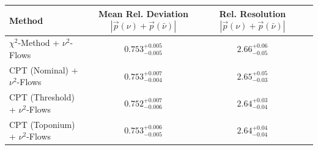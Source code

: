     \begin{tabular}{lccc}
        \toprule
        Method & Mean Rel. Deviation $|\vec{p}(\nu) + \vec{p}(\bar{\nu})|$ & Rel. Resolution $|\vec{p}(\nu) + \vec{p}(\bar{\nu})|$ \\
        \midrule
        $\chi^2$-Method + $\nu^2$-Flows & $0.753^{+0.005}_{-0.005}$ & $2.66^{+0.06}_{-0.05}$ \\
        CPT (Nominal) + $\nu^2$-Flows & $0.753^{+0.007}_{-0.004}$ & $2.65^{+0.05}_{-0.03}$ \\
        CPT (Threshold) + $\nu^2$-Flows & $0.752^{+0.007}_{-0.006}$ & $2.64^{+0.03}_{-0.04}$ \\
        CPT (Toponium) + $\nu^2$-Flows & $0.753^{+0.006}_{-0.005}$ & $2.64^{+0.04}_{-0.04}$ \\
        \bottomrule
    \end{tabular}